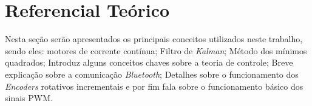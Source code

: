 \chapter[Referencial Teórico]{Referencial Teórico}
\label{ch:referencial_teorico}

Nesta seção serão apresentados os principais conceitos utilizados neste trabalho, sendo eles: motores de corrente contínua; Filtro de \emph{Kalman}; Método dos mínimos quadrados; Introduz alguns conceitos chaves sobre a teoria de controle; Breve explicação sobre a comunicação \emph{Bluetooth}; Detalhes sobre o funcionamento dos \emph{Encoders} rotativos incrementais e por fim fala sobre o funcionamento básico dos sinais PWM.







